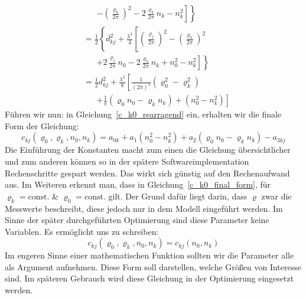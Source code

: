 {\begin{align}
	&\phantom{=}\; 
	\left.\left.-\left(\frac{\varrho_k}{2\pi}\right)^2-2\frac{\varrho_k}{2\pi}n_k-n_k^2\right]\right\}\\
%    
    &=\frac{1}{2}\left\{d_{kj}^2+\frac{\lambda^2}{4}\left[\left(\frac{\varrho_j}{2\pi}\right)^2-\left(\frac{\varrho_k}{2\pi}\right)^2 \right.\right.\nonumber\\
    &\phantom{=}\;
   	\left.\left.+2\frac{\varrho_j}{2\pi}n_0-2\frac{\varrho_k}{2\pi}n_k+n_0^2-n_k^2\right]\right\}\\
%	
	&=\frac{1}{2}d_{kj}^2+\frac{\lambda^2}{8}\left[\frac{1}{(2\pi)^2}\left(\varrho_0^2-\varrho_k^2\right) \right.\nonumber\\
	&\phantom{=}\;
	\left. +\frac{1}{\pi}\left(\varrho_0n_0-\varrho_kn_k\right)+\left(n_0^2-n_k^2\right)\right]\label{c_k0_rearragend}
\end{align}
%
Führen wir nun:
%
in Gleichung~\eqref{c_k0_rearragend} ein, erhalten wir die finale Form der Gleichung:
\begin{equation}
c_{kj}(\varrho_0, \varrho_k, n_0, n_k) = a_{0k}+a_1(n_0^2-n_k^2)+a_2(\varrho_0n_0-\varrho_kn_k)-a_{3kj}\label{c_k0_final_form}   
\end{equation}
%
Die Einführung der Konstanten macht zum einen die Gleichung übersichtlicher und zum anderen können so in der spätere Softwareimplementation Rechenschritte gespart werden. Das wirkt sich günstig auf den Rechenaufwand aus. Im Weiteren erkennt man, dass in Gleichung~\eqref{c_k0_final_form}, für $\varrho_k=\text{const.}$ \& $\varrho_0=\text{const.}$ gilt. Der Grund dafür liegt darin, dass $\varrho$ zwar die Messwerte beschreibt, diese jedoch nur in dem Modell eingeführt werden. Im Sinne der später durchgeführten Optimierung sind diese Parameter keine Variablen. Es ermöglicht uns zu schreiben:
\begin{equation}
c_{kj}(\varrho_0, \varrho_k, n_0, n_k) = c_{kj}(n_0, n_k)
\end{equation}
%
Im engeren Sinne einer mathematischen Funktion sollten wir die Parameter alle als Argument aufnehmen. Diese Form soll darstellen, welche Größen von Interesse sind. Im späteren Gebrauch wird diese Gleichung in der Optimierung eingesetzt werden.\\
}
